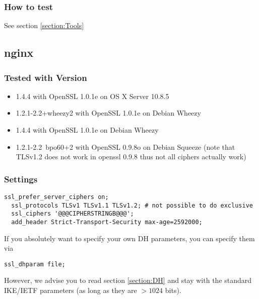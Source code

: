 \subsubsection{How to test} 
See section \ref{section:Tools}



\subsection{nginx}

\subsubsection{Tested with Version} 
\begin{itemize}
\item 1.4.4 with OpenSSL 1.0.1e on OS X Server 10.8.5
\item 1.2.1-2.2+wheezy2 with OpenSSL 1.0.1e on Debian Wheezy
\item 1.4.4 with OpenSSL 1.0.1e on Debian Wheezy
\item 1.2.1-2.2~bpo60+2 with OpenSSL 0.9.8o on Debian Squeeze (note that TLSv1.2 does not work in openssl 0.9.8 thus not all ciphers actually work)
\end{itemize}


\subsubsection{Settings}

\begin{lstlisting}[breaklines]
  ssl_prefer_server_ciphers on;
  ssl_protocols TLSv1 TLSv1.1 TLSv1.2; # not possible to do exclusive
  ssl_ciphers '@@@CIPHERSTRINGB@@@';
  add_header Strict-Transport-Security max-age=2592000;
\end{lstlisting}

If you absolutely want to specify your own DH parameters, you can specify them via

\begin{lstlisting}[breaklines]
  ssl_dhparam file;
\end{lstlisting}

However, we advise you to read section \ref{section:DH} and stay with the standard IKE/IETF parameters (as long as they are $ > 1024 $ bits).


